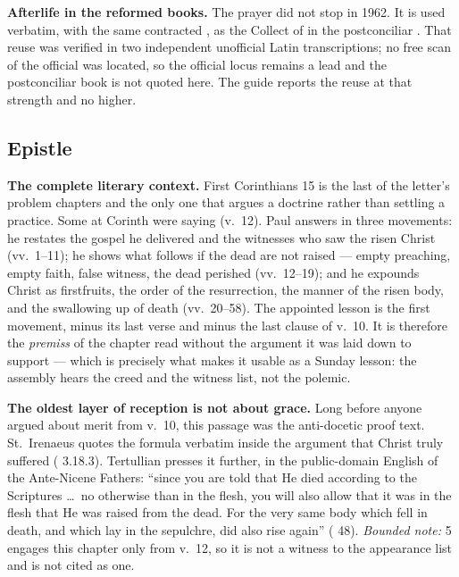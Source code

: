 \textbf{Afterlife in the reformed books.} The prayer did not stop in 1962. It
is used verbatim, with the same contracted , as the Collect of
 in the postconciliar .
That reuse was verified in two independent unofficial Latin transcriptions; no
free scan of the official  was located, so the
official locus remains a lead and the postconciliar book is not quoted here.
The guide reports the reuse at that strength and no higher.

\elementguard
\subsection*{Epistle }


\textbf{The complete literary context.} First Corinthians 15 is the last of the
letter's problem chapters and the only one that argues a doctrine rather than
settling a practice. Some at Corinth were saying  (v.~12). Paul answers in three movements: he restates the gospel he
delivered and the witnesses who saw the risen Christ (vv.~1--11); he shows what
follows if the dead are not raised --- empty preaching, empty faith, false
witness, the dead perished (vv.~12--19); and he expounds Christ as firstfruits,
the order of the resurrection, the manner of the risen body, and the swallowing
up of death (vv.~20--58). The appointed lesson is the first movement, minus its
last verse and minus the last clause of v.~10. It is therefore the
\textit{premiss} of the chapter read without the argument it was laid down to
support --- which is precisely what makes it usable as a Sunday lesson: the
assembly hears the creed and the witness list, not the polemic.

\textbf{The oldest layer of reception is not about grace.} Long before anyone
argued about merit from v.~10, this passage was the anti-docetic proof text.
St.~Irenaeus quotes the formula verbatim inside the argument that Christ truly
suffered ( 3.18.3). Tertullian presses it further, in
the public-domain English of the Ante-Nicene Fathers: ``since you are told that
He died according to the Scriptures \dots\ no otherwise than in the flesh, you
will also allow that it was in the flesh that He was raised from the dead. For
the very same body which fell in death, and which lay in the sepulchre, did
also rise again'' ( 48). \textit{Bounded note:}
 5 engages this chapter only from v.~12, so it is not
a witness to the appearance list and is not cited as one.


